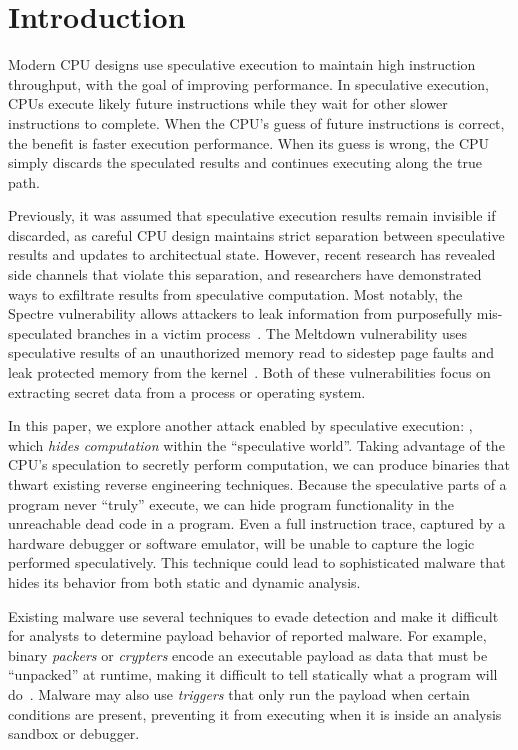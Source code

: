 
\section{Introduction}


Modern CPU designs use speculative execution to maintain high instruction
throughput, with the goal of improving performance. In speculative execution,
CPUs execute likely future instructions while they wait for other slower
instructions to complete. When the CPU's guess of future instructions is correct, the
benefit is faster execution performance. When its guess is wrong, the CPU
simply discards the speculated results and continues executing along the true path.


Previously, it was assumed that speculative execution results
remain invisible if discarded, as careful CPU design maintains strict separation
between speculative results and updates to architectual state.
However, recent research has revealed side channels that violate this
separation, and researchers have demonstrated ways to exfiltrate results from speculative
computation. Most notably, the Spectre vulnerability allows attackers to leak
information from purposefully mis-speculated branches in a victim
process~\cite{spectre}. The Meltdown vulnerability uses speculative results of an
unauthorized memory read to sidestep page faults and leak protected memory from
the kernel~\cite{meltdown}. Both of these vulnerabilities focus on extracting
secret data from a process or operating system.

\medskip

In this paper, we explore another attack enabled by speculative execution:
\speculake, which \emph{hides computation} within
the ``speculative world''. Taking advantage of the CPU's speculation to secretly
perform computation,
we can produce binaries that thwart existing reverse engineering
techniques. Because the speculative parts of a program never ``truly'' execute,
we can hide program functionality in the unreachable dead code in a program.
Even a full instruction trace, captured by a hardware debugger or software
emulator, will be unable to capture the logic performed speculatively.
This technique could lead to sophisticated malware that hides its behavior
from both static and dynamic analysis.


Existing malware use several techniques to evade detection and
make it difficult for analysts to determine payload behavior of reported malware. 
For example, binary \emph{packers} or \emph{crypters} encode an executable payload as
data that must be ``unpacked'' at runtime, making it difficult to tell
statically what a program will do~\cite{malware-packers}. Malware may also use
\emph{triggers} that only run the payload when certain conditions are present, preventing
it from executing when it is inside an analysis sandbox or debugger.

